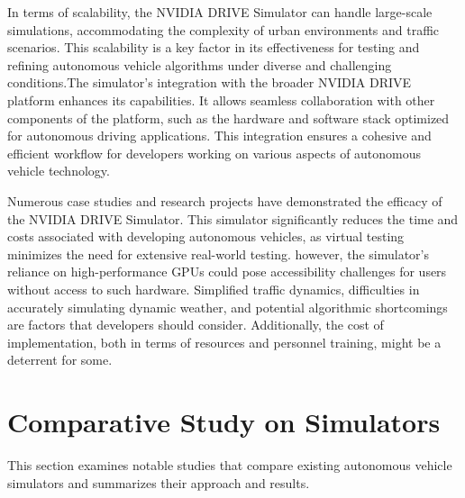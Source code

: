 \documentclass[12pt,twoside,a4paper,parskip]{scrbook} %
\begin{document}
In terms of scalability, the NVIDIA DRIVE Simulator can handle large-scale simulations, accommodating the complexity of urban environments and traffic scenarios. This scalability is a key factor in its effectiveness for testing and refining autonomous vehicle algorithms under diverse and challenging conditions.The simulator's integration with the broader NVIDIA DRIVE platform enhances its capabilities. It allows seamless collaboration with other components of the platform, such as the hardware and software stack optimized for autonomous driving applications. This integration ensures a cohesive and efficient workflow for developers working on various aspects of autonomous vehicle technology.

Numerous case studies and research projects have demonstrated the efficacy of the NVIDIA DRIVE Simulator. This simulator significantly reduces the time and costs associated with developing autonomous vehicles, as virtual testing minimizes the need for extensive real-world testing. however, the simulator's reliance on high-performance GPUs could pose accessibility challenges for users without access to such hardware. Simplified traffic dynamics, difficulties in accurately simulating dynamic weather, and potential algorithmic shortcomings are factors that developers should consider. Additionally, the cost of implementation, both in terms of resources and personnel training, might be a deterrent for some.

\section{Comparative Study on Simulators}
This section examines notable studies that compare existing autonomous vehicle simulators and summarizes their approach and results.
\end{document}
